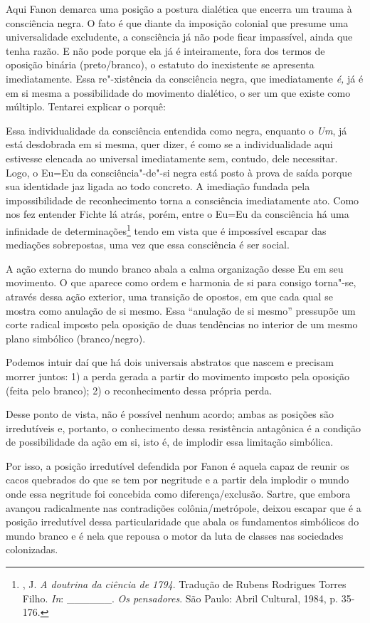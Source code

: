 Aqui Fanon demarca uma posição a
postura dialética que encerra um trauma à consciência negra. O fato é
que diante da imposição colonial que presume uma universalidade
excludente, a consciência já não pode ficar impassível, ainda que tenha
razão. E não pode porque ela já é inteiramente, fora dos termos de
oposição binária (preto/branco), o estatuto do inexistente se apresenta
imediatamente. Essa re"-xistência da consciência negra, que imediatamente
\emph{é,} já é em si mesma a possibilidade do movimento dialético, o ser
um que existe como múltiplo. Tentarei explicar o porquê:

Essa individualidade da consciência entendida como negra, enquanto o
\emph{Um}, já está desdobrada em si mesma, quer dizer, é como se a
individualidade aqui estivesse elencada ao universal imediatamente sem,
contudo, dele necessitar. Logo, o Eu=Eu da consciência"-de"-si negra está
posto à prova de saída porque sua identidade jaz ligada ao todo
concreto. A imediação fundada pela impossibilidade de reconhecimento
torna a consciência imediatamente ato. Como nos fez entender Fichte lá
atrás, porém, entre o Eu=Eu da consciência há uma infinidade de
determinações\footnote{, J. \emph{A doutrina da ciência de 1794}.
  Tradução de Rubens Rodrigues Torres Filho. \emph{In}:
  \_\_\_\_\_\_. \emph{Os pensadores}. São Paulo: Abril Cultural, 1984, p. 35-176.}
tendo em vista que é impossível escapar das mediações sobrepostas, uma
vez que essa consciência é ser social.

A ação externa do mundo branco abala a calma organização desse Eu em seu
movimento. O que aparece como ordem e harmonia de si para consigo
torna"-se, através dessa ação exterior, uma transição de opostos, em que
cada qual se mostra como anulação de si mesmo. Essa ``anulação de si
mesmo'' pressupõe um corte radical imposto pela oposição de duas
tendências no interior de um mesmo plano simbólico (branco/negro).

Podemos intuir daí que há dois universais abstratos que nascem e
precisam morrer juntos: 1) a perda gerada a partir do movimento imposto
pela oposição (feita pelo branco); 2) o reconhecimento dessa própria
perda.

Desse ponto de vista, não é possível nenhum acordo; ambas as posições
são irredutíveis e, portanto, o conhecimento dessa resistência
antagônica é a condição de possibilidade da ação em si, isto é, de
implodir essa limitação simbólica.

Por isso, a posição irredutível defendida por Fanon é aquela capaz de
reunir os cacos quebrados do que se tem por negritude e a partir dela
implodir o mundo onde essa negritude foi concebida como
diferença/exclusão. Sartre, que embora avançou radicalmente nas
contradições colônia/metrópole, deixou escapar que é a posição
irredutível dessa particularidade que abala os fundamentos simbólicos do
mundo branco e é nela que repousa o motor da luta de classes nas
sociedades colonizadas.

